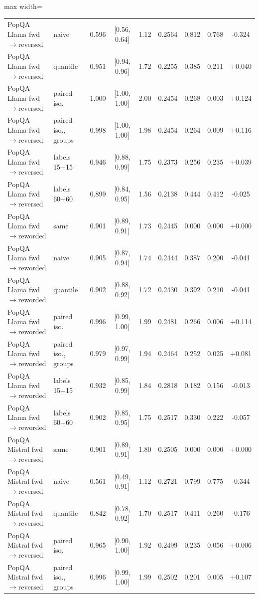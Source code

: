 \documentclass[twoside]{article}
\theoremstyle{definition}
\theoremstyle{remark}
\newcommand{\1}{\mathbf{1}}
\begin{document}
\begin{table}[t]
\begin{adjustbox}{max width=\textwidth}
\begin{tabular}{llccccccc}
PopQA Llama fwd$\to$reversed & naive & 0.596 & [0.56, 0.64] & 1.12 & 0.2564 & 0.812 & 0.768 & -0.324\\
PopQA Llama fwd$\to$reversed & quantile & 0.951 & [0.94, 0.96] & 1.72 & 0.2255 & 0.385 & 0.211 & +0.040\\
PopQA Llama fwd$\to$reversed & paired iso. & 1.000 & [1.00, 1.00] & 2.00 & 0.2454 & 0.268 & 0.003 & +0.124\\
PopQA Llama fwd$\to$reversed & paired iso., groups & 0.998 & [1.00, 1.00] & 1.98 & 0.2454 & 0.264 & 0.009 & +0.116\\
PopQA Llama fwd$\to$reversed & labels 15+15 & 0.946 & [0.88, 0.99] & 1.75 & 0.2373 & 0.256 & 0.235 & +0.039\\
PopQA Llama fwd$\to$reversed & labels 60+60 & 0.899 & [0.84, 0.95] & 1.56 & 0.2138 & 0.444 & 0.412 & -0.025\\
\midrule
PopQA Llama fwd$\to$reworded & same & 0.901 & [0.89, 0.91] & 1.73 & 0.2445 & 0.000 & 0.000 & +0.000\\
PopQA Llama fwd$\to$reworded & naive & 0.905 & [0.87, 0.94] & 1.74 & 0.2444 & 0.387 & 0.200 & -0.041\\
PopQA Llama fwd$\to$reworded & quantile & 0.902 & [0.88, 0.92] & 1.72 & 0.2430 & 0.392 & 0.210 & -0.041\\
PopQA Llama fwd$\to$reworded & paired iso. & 0.996 & [0.99, 1.00] & 1.99 & 0.2481 & 0.266 & 0.006 & +0.114\\
PopQA Llama fwd$\to$reworded & paired iso., groups & 0.979 & [0.97, 0.99] & 1.94 & 0.2464 & 0.252 & 0.025 & +0.081\\
PopQA Llama fwd$\to$reworded & labels 15+15 & 0.932 & [0.85, 0.99] & 1.84 & 0.2818 & 0.182 & 0.156 & -0.013\\
PopQA Llama fwd$\to$reworded & labels 60+60 & 0.902 & [0.85, 0.95] & 1.75 & 0.2517 & 0.330 & 0.222 & -0.057\\
\midrule
PopQA Mistral fwd$\to$reversed & same & 0.901 & [0.89, 0.91] & 1.80 & 0.2505 & 0.000 & 0.000 & +0.000\\
PopQA Mistral fwd$\to$reversed & naive & 0.561 & [0.49, 0.91] & 1.12 & 0.2721 & 0.799 & 0.775 & -0.344\\
PopQA Mistral fwd$\to$reversed & quantile & 0.842 & [0.78, 0.92] & 1.70 & 0.2517 & 0.411 & 0.260 & -0.176\\
PopQA Mistral fwd$\to$reversed & paired iso. & 0.965 & [0.90, 1.00] & 1.92 & 0.2499 & 0.235 & 0.056 & +0.006\\
PopQA Mistral fwd$\to$reversed & paired iso., groups & 0.996 & [0.99, 1.00] & 1.99 & 0.2502 & 0.201 & 0.005 & +0.107\\

\end{tabular}
\end{adjustbox}
\end{table}
\end{document}
